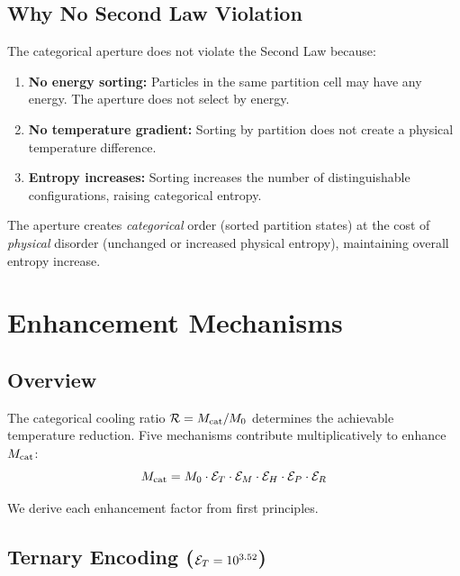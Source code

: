 \subsection{Why No Second Law Violation}

The categorical aperture does not violate the Second Law because:

\begin{enumerate}
    \item \textbf{No energy sorting:} Particles in the same partition cell may have any energy. The aperture does not select by energy.

    \item \textbf{No temperature gradient:} Sorting by partition does not create a physical temperature difference.

    \item \textbf{Entropy increases:} Sorting increases the number of distinguishable configurations, raising categorical entropy.
\end{enumerate}

The aperture creates \textit{categorical} order (sorted partition states) at the cost of \textit{physical} disorder (unchanged or increased physical entropy), maintaining overall entropy increase.

\section{Enhancement Mechanisms}

\subsection{Overview}

The categorical cooling ratio $\mathcal{R} = M_{\mathrm{cat}}/M_0$ determines the achievable temperature reduction. Five mechanisms contribute multiplicatively to enhance $M_{\mathrm{cat}}$:
\begin{equation}
M_{\mathrm{cat}} = M_0 \cdot \mathcal{E}_T \cdot \mathcal{E}_M \cdot \mathcal{E}_H \cdot \mathcal{E}_P \cdot \mathcal{E}_R
\label{eq:total_enhancement}
\end{equation}

We derive each enhancement factor from first principles.

\subsection{Ternary Encoding ($\mathcal{E}_T = 10^{3.52}$)}

